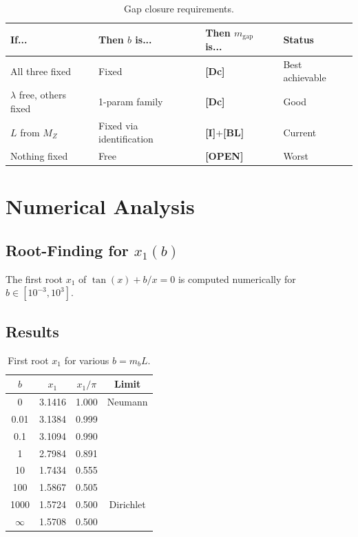 \documentclass[11pt,a4paper]{article}
\newcommand{\mgap}{m_{\mathrm{gap}}}
\newcommand{\mb}{m_b}
\newcommand{\MZ}{M_Z}
\newcommand{\tagDc}{\textbf{[Dc]}}
\newcommand{\tagI}{\textbf{[I]}}
\newcommand{\tagBL}{\textbf{[BL]}}
\newcommand{\tagOPEN}{\textbf{[OPEN]}}
\theoremstyle{definition}
\theoremstyle{plain}
\theoremstyle{remark}
\begin{document}
\begin{table}[htbp]
\centering
\caption{Gap closure requirements.}
\label{tab:closure}
\begin{tabular}{@{}llll@{}}
\toprule
If... & Then $b$ is... & Then $\mgap$ is... & Status \\
\midrule
All three fixed & Fixed & \tagDc{} & Best achievable \\
$\lambda$ free, others fixed & 1-param family & \tagDc{} & Good \\
$L$ from $\MZ$ & Fixed via identification & \tagI{}+\tagBL{} & Current \\
Nothing fixed & Free & \tagOPEN{} & Worst \\
\bottomrule
\end{tabular}
\end{table}

\section{Numerical Analysis}
\label{sec:numerical}

\subsection{Root-Finding for $x_1(b)$}

The first root $x_1$ of $\tan(x) + b/x = 0$ is computed numerically for
$b \in [10^{-3}, 10^3]$.

\subsection{Results}

\begin{table}[htbp]
\centering
\caption{First root $x_1$ for various $b = \mb L$.}
\label{tab:x1-vs-b}
\begin{tabular}{@{}cccc@{}}
\toprule
$b$ & $x_1$ & $x_1/\pi$ & Limit \\
\midrule
0 & 3.1416 & 1.000 & Neumann \\
0.01 & 3.1384 & 0.999 & \\
0.1 & 3.1094 & 0.990 & \\
1 & 2.7984 & 0.891 & \\
10 & 1.7434 & 0.555 & \\
100 & 1.5867 & 0.505 & \\
1000 & 1.5724 & 0.500 & Dirichlet \\
$\infty$ & 1.5708 & 0.500 & \\
\bottomrule
\end{tabular}
\end{table}
\end{document}
